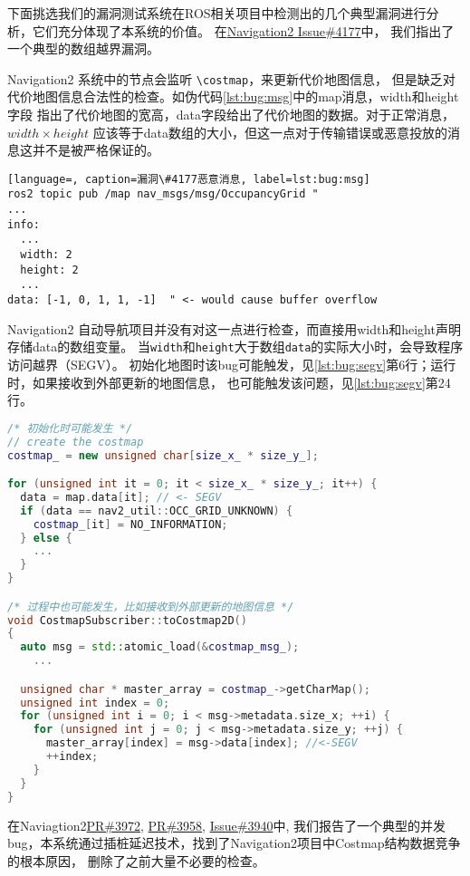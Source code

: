 下面挑选我们的漏洞测试系统在ROS相关项目中检测出的几个典型漏洞进行分析，它们充分体现了本系统的价值。
在\href{https://github.com/ros-planning/navigation2/issues/4177}{Navigation2 Issue\#4177}中，
我们指出了一个典型的数组越界漏洞。

Navigation2 系统中的节点会监听 \texttt{\textbackslash costmap}，来更新代价地图信息，
但是缺乏对代价地图信息合法性的检查。如伪代码\ref{lst:bug:msg}中的map消息，width和height字段
指出了代价地图的宽高，data字段给出了代价地图的数据。对于正常消息，$width\times height$ 
应该等于data数组的大小，但这一点对于传输错误或恶意投放的消息这并不是被严格保证的。

\begin{lstlisting}[language=, caption=漏洞\#4177恶意消息, label=lst:bug:msg]
ros2 topic pub /map nav_msgs/msg/OccupancyGrid "
...
info:
  ...
  width: 2
  height: 2
  ...
data: [-1, 0, 1, 1, -1]  " <- would cause buffer overflow
\end{lstlisting}

Navigation2 自动导航项目并没有对这一点进行检查，而直接用width和height声明存储data的数组变量。
当\texttt{width}和\texttt{height}大于数组\texttt{data}的实际大小时，会导致程序访问越界（SEGV）。
初始化地图时该bug可能触发，见\ref{lst:bug:segv}第6行；运行时，如果接收到外部更新的地图信息，
也可能触发该问题，见\ref{lst:bug:segv}第24行。

\begin{lstlisting}[language=C++, caption=漏洞\#4177问题代码, label=lst:bug:segv]
/* 初始化时可能发生 */
// create the costmap
costmap_ = new unsigned char[size_x_ * size_y_];

for (unsigned int it = 0; it < size_x_ * size_y_; it++) {
  data = map.data[it]; // <- SEGV
  if (data == nav2_util::OCC_GRID_UNKNOWN) {
    costmap_[it] = NO_INFORMATION;
  } else {
    ...
  }
}

/* 过程中也可能发生，比如接收到外部更新的地图信息 */
void CostmapSubscriber::toCostmap2D()
{
  auto msg = std::atomic_load(&costmap_msg_);
	...

  unsigned char * master_array = costmap_->getCharMap();
  unsigned int index = 0;
  for (unsigned int i = 0; i < msg->metadata.size_x; ++i) {
    for (unsigned int j = 0; j < msg->metadata.size_y; ++j) {
      master_array[index] = msg->data[index]; //<-SEGV
      ++index;
    }
  }
}
\end{lstlisting}

在Naviagtion2\href{https://github.com/ros-planning/navigation2/pull/3958}{PR\#3972}, 
\href{https://github.com/ros-planning/navigation2/pull/3958}{PR\#3958}, 
\href{https://github.com/ros-planning/navigation2/issues/3940}{Issue\#3940}中, 
我们报告了一个典型的并发bug，本系统通过插桩延迟技术，找到了Navigation2项目中Costmap结构数据竞争的根本原因，
删除了之前大量不必要的检查。

